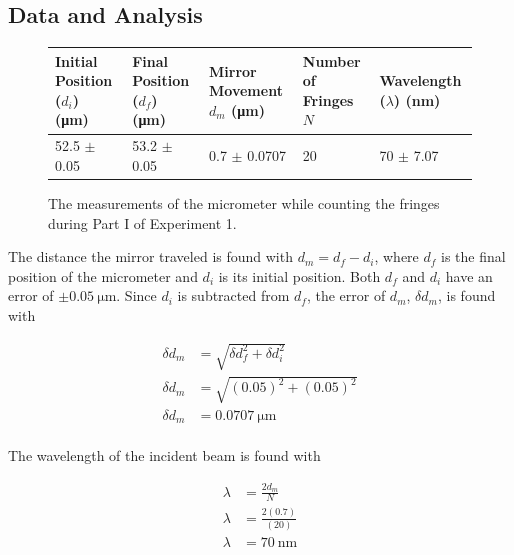 \documentclass[12pt]{article}
\begin{document}
\subsection{Data and Analysis}

\begin{figure}[H]
  \label{fig:exp1MicrometerMeasurements}
  \caption{The measurements of the micrometer while counting the fringes during
    Part I of Experiment 1.}
  \begin{adjustwidth}{-2cm}{}
    \begin{center}
      \begin{tabularx}{18cm}{|X|X|X|X|X|}
        \hline
        Initial Position (\(d_i\)) (\si{\micro\meter}) & 
        Final Position (\(d_f\)) (\si{\micro\meter}) &
        Mirror Movement \(d_m\) (\si{\micro\meter}) &
        Number of Fringes \(N\) & 
        Wavelength (\(\lambda\)) (\si{\nano\meter}) \\
        \hline
        52.5 \(\pm\) 0.05 & 53.2 \(\pm\) 0.05 & 0.7 \(\pm\) \num{0.0707} & 20 &
        70 \(\pm\) 7.07 \\
        \hline
      \end{tabularx}
    \end{center}
  \end{adjustwidth}
\end{figure}

\qq The distance the mirror traveled is found with \(d_m = d_f - d_i\), where
\(d_f\) is the final position of the micrometer and \(d_i\) is its initial
position. Both \(d_f\) and \(d_i\) have an error of \(\pm
\SI{0.05}{\micro\meter}\). Since \(d_i\) is subtracted from \(d_f\), the error
of \(d_m\), \(\delta d_m\), is found with

\begin{align*}
  \delta d_m &= \sqrt{\delta d_f^2 + \delta d_i^2} \\
  \delta d_m &= \sqrt{(0.05)^2 + (0.05)^2} \\
  \delta d_m &= \SI{0.0707}{\micro\meter} \\
\end{align*}

\qq The wavelength of the incident beam is found with

\begin{align*}
  \lambda &= \frac{2 d_m}{N} \\
  \lambda &= \frac{2 (0.7)}{(20)} \\
  \lambda &= \SI{70}{\nano\meter} \\
\end{align*}
\end{document}
